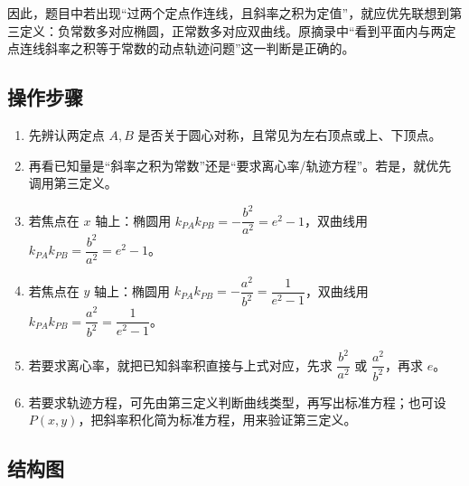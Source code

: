 \documentclass[UTF8,a4paper,11pt]{ctexart}
\begin{document}
因此，题目中若出现“过两个定点作连线，且斜率之积为定值”，就应优先联想到第三定义：负常数多对应椭圆，正常数多对应双曲线。原摘录中“看到平面内与两定点连线斜率之积等于常数的动点轨迹问题”这一判断是正确的。

\subsection*{操作步骤}

\begin{enumerate}

\item 先辨认两定点 $A,B$ 是否关于圆心对称，且常见为左右顶点或上、下顶点。

\item 再看已知量是“斜率之积为常数”还是“要求离心率/轨迹方程”。若是，就优先调用第三定义。

\item 若焦点在 $x$ 轴上：椭圆用 $k_{PA}k_{PB}=-\dfrac{b^2}{a^2}=e^2-1$，双曲线用 $k_{PA}k_{PB}=\dfrac{b^2}{a^2}=e^2-1$。

\item 若焦点在 $y$ 轴上：椭圆用 $k_{PA}k_{PB}=-\dfrac{a^2}{b^2}=\dfrac{1}{e^2-1}$，双曲线用 $k_{PA}k_{PB}=\dfrac{a^2}{b^2}=\dfrac{1}{e^2-1}$。

\item 若要求离心率，就把已知斜率积直接与上式对应，先求 $\dfrac{b^2}{a^2}$ 或 $\dfrac{a^2}{b^2}$，再求 $e$。

\item 若要求轨迹方程，可先由第三定义判断曲线类型，再写出标准方程；也可设 $P(x,y)$，把斜率积化简为标准方程，用来验证第三定义。

\end{enumerate}

\subsection*{结构图}
\end{document}

